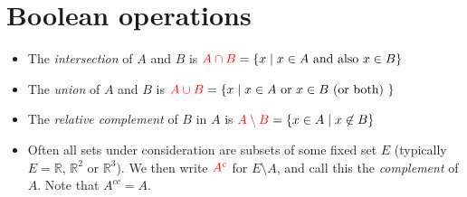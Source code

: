 \documentclass[a4paper]{book}
\newcommand{\RED}[1]{{\color{red}#1}}
\newcommand{\R}         {{\mathbb{R}}}
\newcommand{\sm}        {\setminus}
\newcommand{\st}        {\;|\;}
\renewcommand{\:}{\colon}
\newcommand{\EMPH}[1]{\RED{\emph{#1}}}
\theoremstyle{definition}
\begin{document}
\section{Boolean operations}\label{sec-boolean}

\begin{itemize}
  \item The \EMPH{intersection} of $A$ and $B$ is
   $\RED{A\cap B}=\{x\st x\in A \text{ and also } x\in B\}$
  \item The \EMPH{union} of $A$ and $B$ is
   $\RED{A\cup B}=\{x\st x\in A \text{ or } x\in B \text{ (or both) }\}$
  \item The \EMPH{relative complement} of $B$ in $A$ is
   $\RED{A\sm B}=\{x\in A \st x\not\in B\}$
  \item Often all sets under consideration are subsets of some fixed
   set $E$ (typically $E=\R$, $\R^2$ or $\R^3$).  We then write
   $\RED{A^c}$ for $E\sm A$, and call this the \EMPH{complement} of
   $A$.  Note that $A^{cc}=A$.
\end{itemize} 
\end{document}
